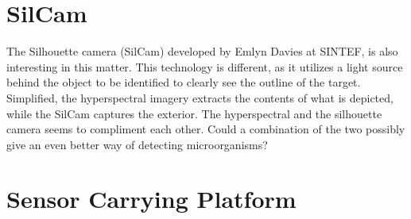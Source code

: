 \section{SilCam}
The Silhouette camera (SilCam) developed by Emlyn Davies at SINTEF, is also interesting in this matter. This technology is different, as it utilizes a light source behind the object to be identified to clearly see the outline of the target. Simplified, the hyperspectral imagery extracts the contents of what is depicted, while the SilCam captures the exterior. The hyperspectral and the silhouette camera seems to compliment each other. Could a combination of the two possibly give an even better way of detecting microorganisms?



\section{Sensor Carrying Platform}

